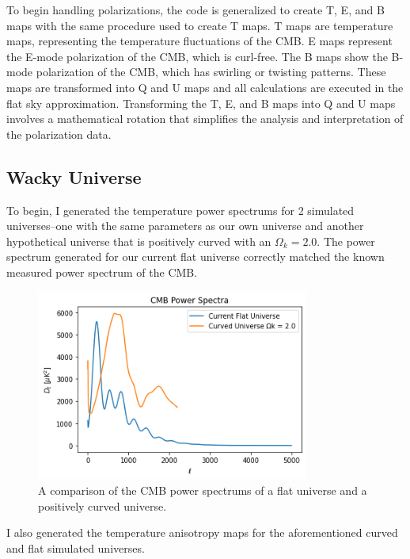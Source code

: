 \documentclass[12pt]{article}
\begin{document}
To begin handling polarizations, the code is generalized to create T, E, and B maps with the same procedure used to create T maps. T maps are temperature maps, representing the temperature fluctuations of the CMB. E maps represent the E-mode polarization of the CMB, which is curl-free. The B maps show the B-mode polarization of the CMB, which has swirling or twisting patterns. These maps are transformed into Q and U maps and all calculations are executed in the flat sky approximation. Transforming the T, E, and B maps into Q and U maps involves a mathematical rotation that simplifies the analysis and interpretation of the polarization data.


\subsection{Wacky Universe}
To begin, I generated the temperature power spectrums for 2 simulated universes–one with the same parameters as our own universe and another hypothetical universe that is positively curved with an $\Omega_k = 2.0$. The power spectrum generated for our current flat universe correctly matched the known measured power spectrum of the CMB.

\begin{figure}[H]
    \centering
    \includegraphics[width=0.8\textwidth]{images/power spectrum.png}
    \caption{A comparison of the CMB power spectrums of a flat universe and a positively curved universe.}
    \label{fig:my_label}
\end{figure}

I also generated the temperature anisotropy maps for the aforementioned curved and flat simulated universes.
\end{document}
